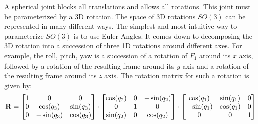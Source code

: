 A spherical joint blocks all translations and allows all rotations.
This joint must be parameterized by a 3D rotation.
The space of 3D rotations $SO(3)$ can be represented in many different ways.
The simplest and most intuitive way to parameterize $SO(3)$ is to use Euler Angles.
It comes down to decomposing the 3D rotation into a succession of three 1D rotations around different axes.
For example, the roll, pitch, yaw is a succession of a rotation of $F_1$ around its $x$ axis, followed by a rotation of the resulting frame around its $y$ axis and a rotation of the resulting frame around its $z$ axis.
The rotation matrix for such a rotation is given by:
\begin{equation}
  {\bf R} =
  \begin{bmatrix}
    1 & 0 & 0 \\
    0 & \cos(q_3) & \sin(q_3) \\
    0 & -\sin(q_3) & \cos(q_3) \\
  \end{bmatrix}
  \cdot
  \begin{bmatrix}
    \cos(q_2) & 0 & -\sin(q_2) \\
    0 & 1 & 0 \\
    \sin(q_2) & 0 & \cos(q_2) \\
  \end{bmatrix}
  \cdot
  \begin{bmatrix}
    \cos(q_1) & \sin(q_1) & 0 \\
    -\sin(q_1) & \cos(q_1) & 0 \\
    0 & 0 & 1
  \end{bmatrix}
\end{equation}

